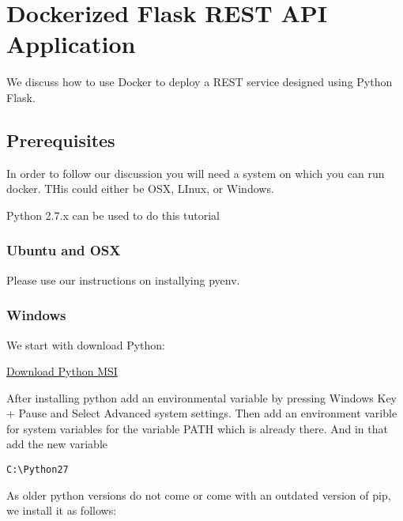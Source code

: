 
\section{Dockerized Flask REST API Application}
\label{s:docker-flask-rest} 
\FILENAME

We discuss how to use Docker to deploy a REST service designed using
Python Flask.

\subsection{Prerequisites}

In order to follow our discussion you will need a system on which you
can run docker. THis could either be OSX, LInux, or Windows.

\begin{NOTE}
  Python 2.7.x can be used to do this tutorial
\end{NOTE}


\subsubsection{Ubuntu and OSX}

Please use our instructions on installying pyenv.

\subsubsection{Windows}

We start with download Python:

\href{https://www.python.org/ftp/python/2.7.14/python-2.7.14.msi}{Download
Python MSI}

After installing python add an environmental variable by pressing
Windows Key + Pause and Select Advanced system settings. Then add an
environment varible for system variables for the variable PATH which is
already there. And in that add the new variable

\begin{lstlisting}
C:\Python27
\end{lstlisting}

As older python versions do not come or come with an outdated version of
pip, we install it as follows:

